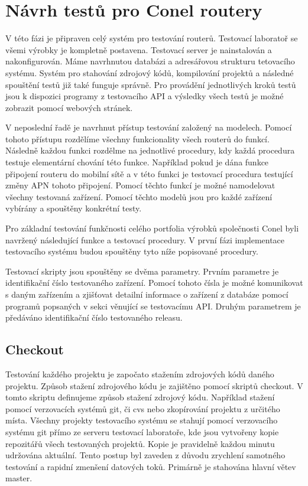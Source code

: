 \chapter{Návrh testů pro Conel routery}
V této fázi je připraven celý systém pro testování routerů. Testovací laboratoř se všemi výrobky je kompletně postavena. Testovací server je nainstalován a nakonfigurován. Máme navrhnutou databázi a adresářovou strukturu tetovacího systému. Systém pro stahování zdrojový kódů, kompilování projektů a následné spouštění testů již také funguje správně. Pro provádění jednotlivých kroků testů jsou k dispozici programy z testovacího API a výsledky všech testů je možné zobrazit pomocí webových stránek.

V neposlední řadě je navrhnut přístup testování založený na modelech. Pomocí tohoto přístupu rozdělíme všechny funkcionality všech routerů do funkcí. Následně každou funkci rozdělme na jednotlivé procedury, kdy každá procedura testuje elementární chování této funkce. Například pokud je dána funkce připojení routeru do mobilní sítě a v této funkci je testovací procedura testující změny APN tohoto připojení. Pomocí těchto funkcí je možné namodelovat všechny testovaná zařízení. Pomocí těchto modelů jsou pro každé zařízení vybírány a spouštěny konkrétní testy.

Pro základní testování funkčnosti celého portfolia výrobků společnosti Conel byli navržený následující funkce a testovací procedury. V první fázi implementace testovacího systému budou spouštěny tyto níže popisované procedury.

Testovací skripty jsou spouštěny se dvěma parametry. Prvním parametre je identifikační číslo testovaného zařízení. Pomocí tohoto čísla je možné komunikovat s daným zařízením a zjišťovat detailní informace o zařízení z databáze pomocí programů popsaných v sekci věnující se testovacímu API. Druhým parametrem je předáváno identifikační číslo testovaného releasu.

\section{Checkout}
Testování každého projektu je započato stažením zdrojových kódů daného projektu. Způsob stažení zdrojového kódu je zajištěno pomocí skriptů checkout. V tomto skriptu definujeme způsob stažení zdrojový kódu. Například stažení pomocí verzovacích systémů git, či cvs nebo zkopírování projektu z určitého místa. Všechny projekty testovacího systému se stahují pomocí verzovacího systému git přímo ze serveru testovací laboratoře, kde jsou vytvořeny kopie repozitářů všech testovaných projektů. Kopie je pravidelně každou minutu udržována aktuální. Tento postup byl zaveden z důvodu zrychlení samotného testování a rapidní zmenšení datových toků. Primárně je stahována hlavní větev master.

